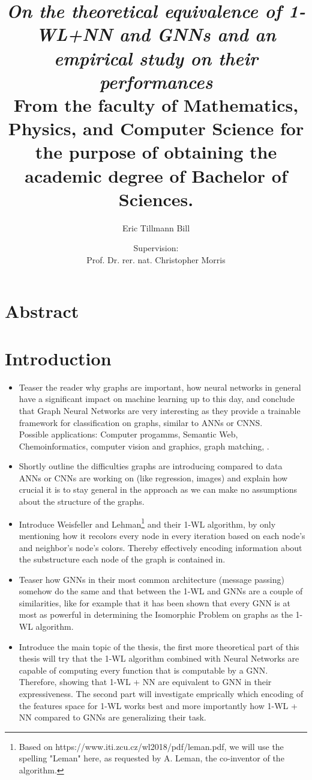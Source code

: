 \documentclass[11pt, dvipsnames, DIV=12]{scrreprt}
\title{\emph{On the theoretical equivalence of 1-WL+NN and GNNs and an empirical study on their performances}\\
\vspace{20pt}\small{\normalfont From the faculty of Mathematics, Physics, and Computer Science for the purpose of obtaining the academic degree of Bachelor of Sciences.}
}
\author{Eric Tillmann Bill}
\affil{\vspace{100pt}}
\author{Supervision:\\Prof. Dr. rer. nat. Christopher Morris}
\affil{Informatik 6\\RWTH Aachen University}
\date{\vspace{-30pt}}
\theoremstyle{definition}
\begin{document}
\maketitle
\tableofcontents

\section{Abstract}


\section{Introduction}
\begin{itemize}
    \item Teaser the reader why graphs are important, how neural networks in general have a significant impact on machine learning up to this day, and conclude that Graph Neural Networks are very interesting as they provide a trainable framework for classification on graphs, similar to ANNs or CNNS.\\
    Possible applications: Computer progamms, Semantic Web, Chemoinformatics, computer vision and graphics, graph matching, \cite{Morris2021}.
    \item Shortly outline the difficulties graphs are introducing compared to data ANNs or CNNs are working on (like regression, images) and explain how crucial it is to stay general in the approach as we can make no assumptions about the structure of the graphs.
    \item Introduce Weisfeller and Lehman\footnote{Based on https://www.iti.zcu.cz/wl2018/pdf/leman.pdf, we will use the spelling "Leman" here, as requested by A. Leman, the co-inventor of the algorithm.} and their 1-WL algorithm, by only mentioning how it recolors every node in every iteration based on each node's and neighbor's node's colors. Thereby effectively encoding information about the substructure each node of the graph is contained in.
    \item Teaser how GNNs in their most common architecture (message passing) somehow do the same and that between the 1-WL and GNNs are a couple of similarities, like for example that it has been shown that every GNN is at most as powerful in determining the Isomorphic Problem on graphs as the 1-WL algorithm.
    \item Introduce the main topic of the thesis, the first more theoretical part of this thesis will try that the 1-WL algorithm combined with Neural Networks are capable of computing every function that is computable by a GNN. Therefore, showing that 1-WL + NN are equivalent to GNN in their expressiveness. The second part will investigate emprically which encoding of the features space for 1-WL works best and more importantly how 1-WL + NN compared to GNNs are generalizing their task.
\end{itemize}
\end{document}
